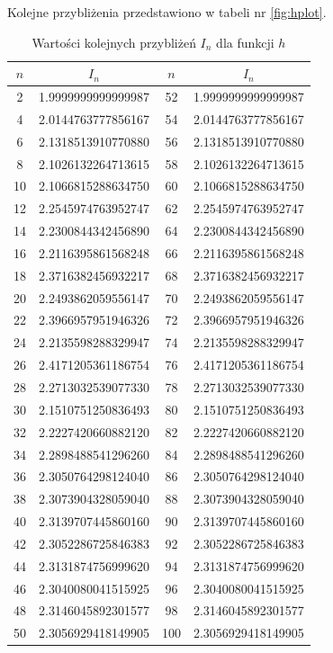\documentclass{article}
\begin{document}
    Kolejne przybliżenia przedstawiono w tabeli nr \ref{fig:hplot}.
    \begin{table}[htb]
      \centering
      \caption{Wartości kolejnych przybliżeń $I_n$ dla funkcji $h$}
      \label{tab:h}
      \begin{tabular}{|c|c|c|c|}
        \hline
        $n$ & $I_n$              & $n$ & $I_n$              \\ \hline
          2 & 1.9999999999999987 &  52 & 1.9999999999999987 \\
          4 & 2.0144763777856167 &  54 & 2.0144763777856167 \\
          6 & 2.1318513910770880 &  56 & 2.1318513910770880 \\
          8 & 2.1026132264713615 &  58 & 2.1026132264713615 \\
         10 & 2.1066815288634750 &  60 & 2.1066815288634750 \\
         12 & 2.2545974763952747 &  62 & 2.2545974763952747 \\
         14 & 2.2300844342456890 &  64 & 2.2300844342456890 \\
         16 & 2.2116395861568248 &  66 & 2.2116395861568248 \\
         18 & 2.3716382456932217 &  68 & 2.3716382456932217 \\
         20 & 2.2493862059556147 &  70 & 2.2493862059556147 \\
         22 & 2.3966957951946326 &  72 & 2.3966957951946326 \\
         24 & 2.2135598288329947 &  74 & 2.2135598288329947 \\
         26 & 2.4171205361186754 &  76 & 2.4171205361186754 \\
         28 & 2.2713032539077330 &  78 & 2.2713032539077330 \\
         30 & 2.1510751250836493 &  80 & 2.1510751250836493 \\
         32 & 2.2227420660882120 &  82 & 2.2227420660882120 \\
         34 & 2.2898488541296260 &  84 & 2.2898488541296260 \\
         36 & 2.3050764298124040 &  86 & 2.3050764298124040 \\
         38 & 2.3073904328059040 &  88 & 2.3073904328059040 \\
         40 & 2.3139707445860160 &  90 & 2.3139707445860160 \\
         42 & 2.3052286725846383 &  92 & 2.3052286725846383 \\
         44 & 2.3131874756999620 &  94 & 2.3131874756999620 \\
         46 & 2.3040080041515925 &  96 & 2.3040080041515925 \\
         48 & 2.3146045892301577 &  98 & 2.3146045892301577 \\
         50 & 2.3056929418149905 & 100 & 2.3056929418149905 \\ \hline
      \end{tabular}
    \end{table}
\end{document}
